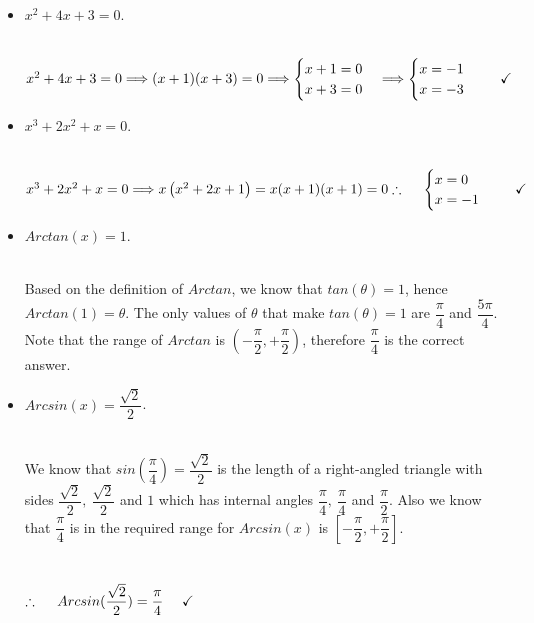 \documentclass[fleqn]{article}
\begin{document}
\begin{enumerate}
\begin{itemize}
      \item $x^2+4x+3=0$.

        \textcolor{hwColor}{
          \\
          $
            x^2+4x+3=0 \Longrightarrow (x+1)(x+3)=0 \Longrightarrow \begin{cases}
              x+1=0
              \\
              x+3=0
            \end{cases} \Longrightarrow \begin{cases}
              x=-1
              \\
              x=-3
            \end{cases} ~~~~ \checkmark
            \\
          $
        }

      \item $x^3+2x^2+x=0$.

        \textcolor{hwColor}{
          \\
          $
            x^3+2x^2+x=0 \Longrightarrow x \left(x^2+2x+1\right)=x(x+1)(x+1)=0
            \\
            \\
            \\
            \therefore ~~~~ \begin{cases}
              x=0
              \\
              x=-1
            \end{cases} ~~~~ \checkmark
          $
        }

      \item $Arctan (x)=1$.

        \textcolor{hwColor}{
          \\
          Based on the definition of $Arctan$, we know that $tan(\theta)=1$, hence $Arctan(1)=\theta$. 
          The only values of $\theta$ that make $tan(\theta)=1$ are $\dfrac{\pi}{4}$ and $\dfrac{5 \pi}{4}$.
          Note that the range of $Arctan$ is $\left(-\dfrac{\pi}{2}, +\dfrac{\pi}{2}\right)$, therefore
          $\dfrac{\pi}{4}$ is the correct answer.
        }

      \item $Arcsin (x)=\dfrac{\sqrt{2}}{2}$.

      \textcolor{hwColor}{
        \\
        We know that $sin(\dfrac{\pi}{4})=\dfrac{\sqrt{2}}{2}$ is the length of a right-angled triangle 
        with sides $\dfrac{\sqrt{2}}{2}, ~ \dfrac{\sqrt{2}}{2}$ and $1$ which has internal 
        angles $\dfrac{\pi}{4}, ~ \dfrac{\pi}{4}$ and $\dfrac{\pi}{2}$. Also we know that $\dfrac{\pi}{4}$ is
        in the required range for $Arcsin(x)$ is $\left[-\dfrac{\pi}{2}, +\dfrac{\pi}{2}\right]$.
        \\
        \\
        \\
        $
          \therefore ~~~~ Arcsin(\dfrac{\sqrt{2}}{2})=\dfrac{\pi}{4} ~~~~ \checkmark
          \\
        $ 
      }


\end{itemize}
\end{enumerate}
\end{document}
